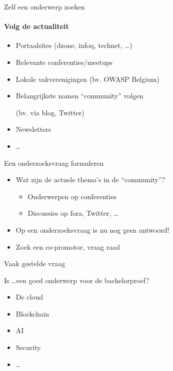 \documentclass[usenames,dvipsnames]{beamer}
\begin{document}
\begin{frame}{Zelf een onderwerp zoeken}
  \framesubtitle{Volg de actualiteit}

  \begin{itemize}
    \item Portaalsites (dzone, infoq, technet, \ldots)
    \item Relevante conferenties/meetups
    \item Lokale vakverenigingen (bv. OWASP Belgium)
    \item Belangrijkste namen ``community'' volgen
    
    (bv. via blog, Twitter)
    
    \item Newsletters
    \item \ldots
  \end{itemize}

\end{frame}

\begin{frame}{Een onderzoeksvraag formuleren}
  
  \begin{itemize}
    \item Wat zijn de actuele thema's in de ``community''?
    \begin{itemize}
      \item Onderwerpen op conferenties
      \item Discussies op fora, Twitter, \ldots
    \end{itemize}
    \item Op een onderzoeksvraag is nu nog geen antwoord!
    \item Zoek een co-promotor, vraag raad
  \end{itemize}
  
\end{frame}

\begin{frame}{Vaak gestelde vraag}
  
  Is \ldots een goed onderwerp voor de bachelorproef?
  
  \begin{itemize}
    \item De cloud
    \item Blockchain
    \item AI
    \item Security
    \item \ldots
  \end{itemize}

\end{frame}
\end{document}
